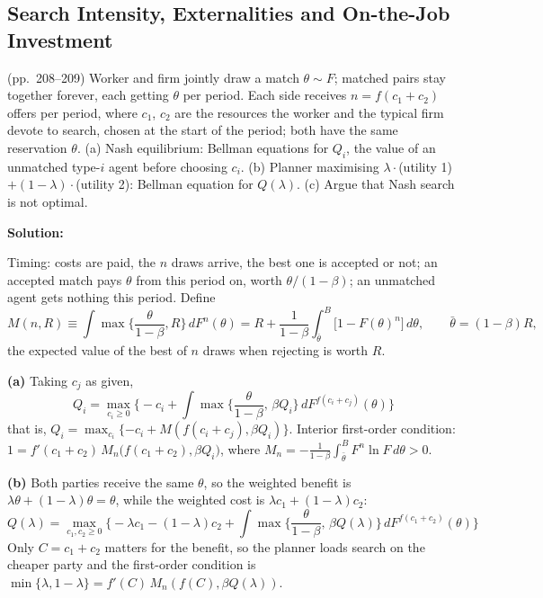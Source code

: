 \documentclass[12pt, letterpaper]{article}
\begin{document}
\subsection{Search Intensity, Externalities and On-the-Job Investment}

\begin{tcolorbox}[evenbox,title={Exercise 6.6 \quad Mortensen Externality}]
\begin{tcolorbox}[questionbox]
(pp.~208--209) Worker and firm jointly draw a match $\theta\sim F$; matched pairs stay together forever, each
getting $\theta$ per period. Each side receives $n=f(c_1+c_2)$ offers per period, where $c_1$, $c_2$ are the
resources the worker and the typical firm devote to search, chosen at the start of the period; both have
the same reservation $\theta$. (a) Nash equilibrium: Bellman equations for $Q_i$, the value of an unmatched
type-$i$ agent before choosing $c_i$. (b) Planner maximising $\lambda\cdot$(utility 1) $+(1-\lambda)\cdot$(utility 2): Bellman
equation for $Q(\lambda)$. (c) Argue that Nash search is not optimal.
\end{tcolorbox}

\textbf{Solution:}

Timing: costs are paid, the $n$ draws arrive, the best one is accepted or not; an accepted match pays
$\theta$ from this period on, worth $\theta/(1-\beta)$; an unmatched agent gets nothing this period. Define
\[
M(n,R)\equiv\int\max\Big\{\frac{\theta}{1-\beta},R\Big\}\,dF^n(\theta)=R+\frac{1}{1-\beta}\int_{\bar\theta}^B\big[1-F(\theta)^n\big]\,d\theta,
\qquad\bar\theta=(1-\beta)R,
\]
the expected value of the best of $n$ draws when rejecting is worth $R$.

\textbf{(a)} Taking $c_j$ as given,
\[
\boxed{Q_i=\max_{c_i\ge0}\Big\{-c_i+\int\max\Big\{\frac{\theta}{1-\beta},\,\beta Q_i\Big\}\,dF^{f(c_i+c_j)}(\theta)\Big\}}
\]
that is, $Q_i=\max_{c_i}\{-c_i+M(f(c_i+c_j),\beta Q_i)\}$. Interior first-order condition: $1=f'(c_1+c_2)\,M_n\big(f(c_1+c_2),\beta Q_i\big)$, where
$M_n=-\frac{1}{1-\beta}\int_{\bar\theta}^BF^n\ln F\,d\theta>0$.

\textbf{(b)} Both parties receive the same $\theta$, so the weighted benefit is $\lambda\theta+(1-\lambda)\theta=\theta$, while the
weighted cost is $\lambda c_1+(1-\lambda)c_2$:
\[
\boxed{Q(\lambda)=\max_{c_1,c_2\ge0}\Big\{-\lambda c_1-(1-\lambda)c_2+\int\max\Big\{\frac{\theta}{1-\beta},\,\beta Q(\lambda)\Big\}\,dF^{f(c_1+c_2)}(\theta)\Big\}}
\]
Only $C=c_1+c_2$ matters for the benefit, so the planner loads search on the cheaper party and the
first-order condition is $\min\{\lambda,1-\lambda\}=f'(C)\,M_n(f(C),\beta Q(\lambda))$.


\end{tcolorbox}
\end{document}
